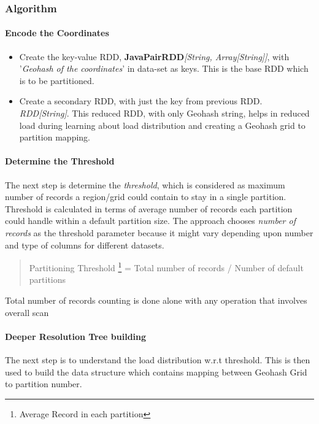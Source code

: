\documentclass[article,type=msc,colorback,12pt,accentcolor=tud1d]{tudthesis}
\begin{document}
							 
			
			\subsubsection{Algorithm}
			
			\paragraph{Encode the Coordinates}
				\begin{itemize}
					\item Create the key-value RDD, \textbf{JavaPairRDD}\textit{[String, Array[String]]}, with '\textit{Geohash of the coordinates}' in data-set as keys. This is the base RDD which is to be partitioned.
					\item Create a secondary RDD, with just the key from previous RDD. \textit{RDD[String]}. This reduced RDD, with only Geohash string, helps in reduced load during learning about load distribution and creating a Geohash grid to partition mapping. 
				\end{itemize}
			\paragraph{Determine the Threshold}
				The next step is determine the \textit{threshold}, which is considered as maximum number of records a region/grid could contain to stay in a single partition. Threshold is calculated in terms of average number of records each partition could handle within a default partition size. The approach chooses\textit{ number of records} as the threshold parameter because it might vary depending upon number and type of columns for different datasets.
				
				
				\begin{quote} Partitioning Threshold \footnote{Average Record in each partition}  = Total number  of records / Number of default partitions
				\end{quote}
				
				Total number of records counting is done alone with any operation that involves overall scan
			
			\paragraph{Deeper Resolution Tree building}
				The next step is to understand the load distribution w.r.t threshold. This is then used to build the data structure which contains mapping between Geohash Grid to partition number.
				
\end{document}
